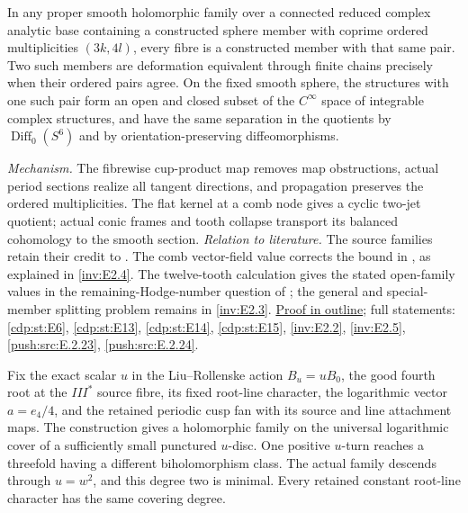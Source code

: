 \begin{maintheorem}
In any proper smooth holomorphic family over a connected reduced
complex analytic base containing a constructed sphere member with
coprime ordered multiplicities $(3k,4l)$, every fibre is a
constructed member with that same pair. Two such members are
deformation equivalent through finite chains precisely when their
ordered pairs agree. On the fixed smooth sphere, the structures
with one such pair form an open and closed subset of the
$C^\infty$ space of integrable complex structures, and have the
same separation in the quotients by $\operatorname{Diff}_0(S^6)$
and by orientation-preserving diffeomorphisms.

\end{maintheorem}

\textit{Mechanism.} The fibrewise cup-product map removes map
obstructions, actual period sections realize all tangent
directions, and propagation preserves the ordered multiplicities.
The flat kernel at a comb node gives a cyclic two-jet quotient;
actual conic frames and tooth collapse transport its balanced
cohomology to the smooth section.
\textit{Relation to literature.} The source families retain their
credit to \cite{Viaclovsky2026Two,LiuRollenske2026,Viaclovsky2026Combs}.
The comb vector-field value corrects the bound in
\cite[Corollary~1.3, p.~2]{HKP2000}, as explained in
\ref{inv:E2.4}.
The twelve-tooth calculation gives the stated open-family values
in the remaining-Hodge-number question of
\cite[Section~10(2)]{Viaclovsky2026Combs}; the general and
special-member splitting problem remains in \ref{inv:E2.3}.
\hyperlink{outline-II-F}{Proof in outline}; full statements:
\ref{cdp:st:E6}, \ref{cdp:st:E13}, \ref{cdp:st:E14},
\ref{cdp:st:E15}, \ref{inv:E2.2}, \ref{inv:E2.5},
\ref{push:src:E.2.23}, \ref{push:src:E.2.24}.

\hypertarget{main-II-G}{}
\begin{maintheorem}
\hypertarget{tag-03K8}{}\label{series:II:G}
Fix the exact scalar $u$ in the Liu--Rollenske action $B_u=uB_0$,
the good fourth root at the $III^*$ source fibre, its fixed
root-line character, the logarithmic vector $a=e_4/4$, and the
retained periodic cusp fan with its source and line attachment
maps. The construction gives a holomorphic family on the universal
logarithmic cover of a sufficiently small punctured $u$-disc.
One positive $u$-turn reaches a threefold having a different
biholomorphism class. The actual family descends through
$u=w^2$, and this degree two is minimal. Every retained constant
root-line character has the same covering degree.

\end{maintheorem}

